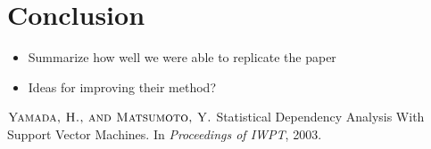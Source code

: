 \documentclass[12pt,fleqn]{article}
\begin{document}
\section{Conclusion}
\begin{itemize}
\item Summarize how well we were able to replicate the paper
\item Ideas for improving their method?
\end{itemize}

\begin{thebibliography}{1}
$\textsc{Yamada, H., and Matsumoto, Y.}$ Statistical Dependency Analysis With Support Vector Machines. In \emph{Proceedings of IWPT}, 2003.
\end{thebibliography}
\end{document}
